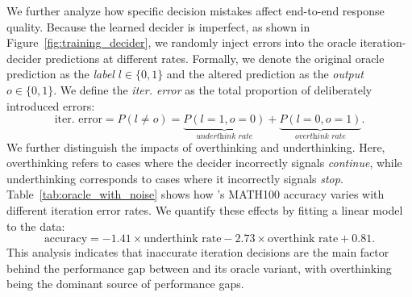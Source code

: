 We further analyze how specific decision mistakes affect end-to-end response quality.
Because the learned decider is imperfect, as shown in Figure~\ref{fig:training_decider}, we randomly inject errors into the oracle iteration-decider predictions at different rates.
Formally, we denote the original oracle prediction as the \textit{label} $l \in \{0,1\}$ and the altered prediction as the \textit{output} $o \in \{0,1\}$.
We define the \textit{iter. error} as the total proportion of deliberately introduced errors:
\begin{equation}
    \text{iter. error} = P(l \neq o) =
    \underbrace{P(l=1,o=0)}_{\textit{underthink rate}}
    + \underbrace{P(l=0,o=1)}_{\textit{overthink rate}}.
\end{equation}
We further distinguish the impacts of overthinking and underthinking.
Here, overthinking refers to cases where the decider incorrectly signals \textit{continue}, while underthinking corresponds to cases where it incorrectly signals \textit{stop}.
Table~\ref{tab:oracle_with_noise} shows how \name's MATH100 accuracy varies with different iteration error rates.
We quantify these effects by fitting a linear model to the data:
$$
\text{accuracy} = -1.41 \times \text{underthink rate} - 2.73 \times \text{overthink rate} + 0.81.
$$
This analysis indicates that inaccurate iteration decisions are the main factor behind the performance gap between \name and its oracle variant, with overthinking being the dominant source of performance gaps.

